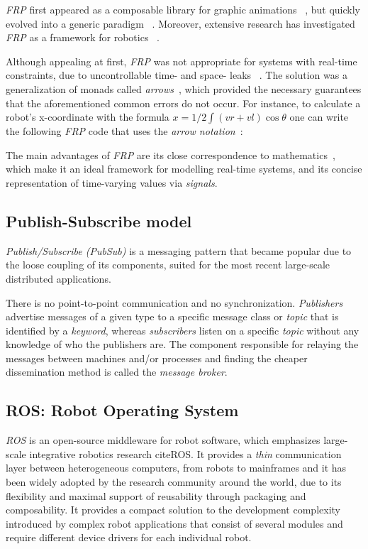 \documentclass[sigplan,review,anonymous]{acmart}
\begin{document}
\textit{FRP} first appeared as a composable library for graphic animations
~\cite{fran}, but quickly evolved into a generic paradigm
~\cite{survey_frp,real_frp,pushpull_frp}. Moreover, extensive research has
investigated \textit{FRP} as a framework for robotics
~\cite{arrows_robots,lambda_in_motion}.

Although appealing at first, \textit{FRP} was not appropriate for systems  with
real-time constraints, due to uncontrollable time- and space- leaks
~\cite{event_frp}. The solution was a generalization of monads called
\textit{arrows}~\cite{arrows}, which provided the necessary guarantees that the
aforementioned common errors do not occur. For instance, to calculate
a robot's x-coordinate with the formula $x = 1/2 \int (vr + vl) \cos\theta$
one can write the following \textit{FRP} code that uses the \textit{arrow notation}~\cite{arrows_notation}:

The main advantages of \textit{FRP} are its close correspondence to
mathematics~\cite{survey_frp}, which make it an ideal framework for modelling
real-time systems, and its concise representation of time-varying values via
\textit{signals}.

\subsection{Publish-Subscribe model}

\textit{Publish/Subscribe (PubSub)} is a messaging pattern that became popular
due to the loose coupling of its components, suited for the most recent
large-scale distributed applications.

There is no point-to-point communication and no synchronization.
\textit{Publishers} advertise messages of a given type to a specific message
class or \textit{topic} that is identified by a \textit{keyword}, whereas
\textit{subscribers} listen on a specific \textit{topic} without any knowledge
of who the publishers are. The component responsible for relaying the messages
between machines and/or processes and finding the cheaper dissemination method
is called the \textit{message broker}.

\subsection{ROS: Robot Operating System}

\textit{ROS} is an open-source middleware for robot software, which emphasizes
large-scale integrative robotics research cite{ROS}. It provides a \textit{thin}
communication layer between heterogeneous computers, from robots to mainframes
and it has been widely adopted by the research community around the world, due
to its flexibility and maximal support of reusability through packaging and
composability. It provides a compact solution to the development complexity
introduced by complex robot applications that consist of several modules and
require different device drivers for each individual robot.
\end{document}
